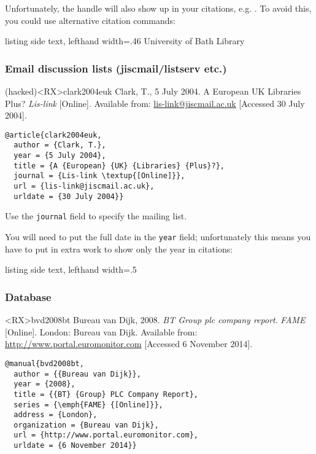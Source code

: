 \documentclass[10pt,a4paper]{article}
\newenvironment{tips}{%
  \begin{list}{\makebox[2em][c]{\faLightbulbO}}{%
    \setlength{\leftmargin}{2em}
    \setlength{\labelwidth}{2em}
    \setlength{\labelsep}{0pt}}
}{\end{list}}
\newenvironment{hacks}{%
  \begin{list}{\makebox[2em][c]{\faWrench}}{%
    \setlength{\leftmargin}{2em}
    \setlength{\labelwidth}{2em}
    \setlength{\labelsep}{0pt}}
}{\end{list}}
\begin{document}
\begin{hacks}\item
Unfortunately, the handle will also show up in your citations, e.g.\@
\cite{ublib2021ip}. To avoid this, you could use alternative citation commands:
\begin{tcblisting}{listing side text, lefthand width=.46\linewidth}
University of Bath Library \citeyearpar{ublib2021ip}
\end{tcblisting}
\end{hacks}

\subsubsection*{Email discussion lists (jiscmail\slash listserv etc.)}

\begin{bibexbox}(hacked)<RX>{clark2004euk}
  Clark, T., 5 July 2004. A European UK Libraries Plus? \emph{Lis-link} [Online]. Available from: \url{lis-link@jiscmail.ac.uk} [Accessed 30 July 2004].
  \tcblower
\begin{Verbatim}
@article{clark2004euk,
  author = {Clark, T.},
  year = {5 July 2004},
  title = {A {European} {UK} {Libraries} {Plus}?},
  journal = {Lis-link \textup{[Online]}},
  url = {lis-link@jiscmail.ac.uk},
  urldate = {30 July 2004}}
\end{Verbatim}
\end{bibexbox}

\begin{tips}\item
Use the \texttt{journal} field to specify the mailing list.
\end{tips}

\begin{hacks}\item
You will need to put the full date in the \texttt{year} field;
unfortunately this means you have to put in extra work to show only the year in citations:
\end{hacks}

\begin{tcblisting}{listing side text, lefthand width=.5\linewidth}
\citetext{\citeauthor[2004]{clark2004euk}}
\end{tcblisting}

\subsubsection*{Database}

\begin{bibexbox}<RX>{bvd2008bt}
  Bureau van Dijk, 2008. \emph{BT Group plc company report}. \emph{FAME} [Online]. London: Bureau van Dijk. Available from: \url{http://www.portal.euromonitor.com} [Accessed 6 November 2014].
  \tcblower
\begin{Verbatim}
@manual{bvd2008bt,
  author = {{Bureau van Dijk}},
  year = {2008},
  title = {{BT} {Group} PLC Company Report},
  series = {\emph{FAME} {[Online]}},
  address = {London},
  organization = {Bureau van Dijk},
  url = {http://www.portal.euromonitor.com},
  urldate = {6 November 2014}}
\end{Verbatim}
\end{bibexbox}
\end{document}
